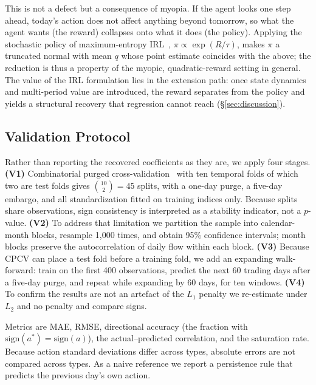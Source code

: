 This is not a defect but a consequence of myopia. If the agent looks one step
ahead, today's action does not affect anything beyond tomorrow, so what the agent
wants (the reward) collapses onto what it does (the policy). Applying the
stochastic policy of maximum-entropy IRL~\cite{ziebart2008maximum},
$\pi\propto\exp(R/\tau)$, makes $\pi$ a truncated normal with mean $q$ whose
point estimate coincides with the above; the reduction is thus a property of the
myopic, quadratic-reward setting in general. The value of the IRL formulation
lies in the extension path: once state dynamics and multi-period value are
introduced, the reward separates from the policy and yields a structural recovery
that regression cannot reach (\S\ref{sec:discussion}).

\subsection{Validation Protocol}
\label{sec:protocol}

Rather than reporting the recovered coefficients as they are, we apply four
stages. \textbf{(V1)} Combinatorial purged
cross-validation~\cite{lopez2018advances} with ten temporal folds of which two
are test folds gives $\binom{10}{2}=45$ splits, with a one-day purge, a five-day
embargo, and all standardization fitted on training indices only. Because splits
share observations, sign consistency is interpreted as a stability indicator, not
a $p$-value. \textbf{(V2)} To address that limitation we partition the sample
into calendar-month blocks, resample 1{,}000 times, and obtain 95\% confidence
intervals; month blocks preserve the autocorrelation of daily flow within each
block. \textbf{(V3)} Because CPCV can place a test fold before a training fold,
we add an expanding walk-forward: train on the first 400 observations, predict
the next 60 trading days after a five-day purge, and repeat while expanding by 60
days, for ten windows. \textbf{(V4)} To confirm the results are not an artefact
of the $L_1$ penalty we re-estimate under $L_2$ and no penalty and compare signs.

Metrics are MAE, RMSE, directional accuracy (the fraction with
$\mathrm{sign}(a^{*})=\mathrm{sign}(a)$), the actual--predicted correlation, and
the saturation rate. Because action standard deviations differ across types,
absolute errors are not compared across types. As a naive reference we report a
persistence rule that predicts the previous day's own action.

